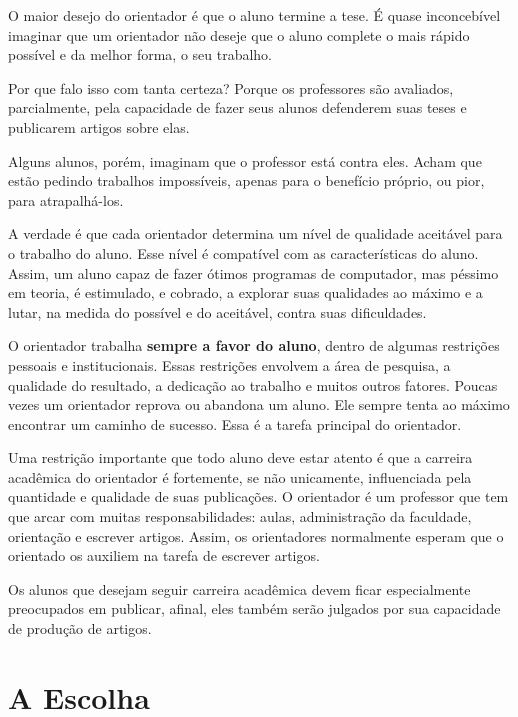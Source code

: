 O maior desejo do orientador é que o aluno termine a tese. É quase inconcebível imaginar que um orientador não deseje que o aluno complete o mais rápido possível e da melhor forma, o seu trabalho. 

Por que falo isso com tanta certeza? Porque os professores são avaliados, parcialmente, pela capacidade de fazer seus alunos defenderem suas teses e publicarem artigos sobre elas.

Alguns alunos, porém, imaginam que o professor está contra eles. Acham que estão pedindo trabalhos impossíveis, apenas para o benefício próprio, ou pior, para atrapalhá-los.

A verdade é que cada orientador determina um nível de qualidade aceitável para o trabalho do aluno. Esse nível é compatível com as características do aluno. 
Assim, um aluno capaz de fazer ótimos programas de computador, mas péssimo em teoria, é estimulado, e cobrado, a explorar suas qualidades ao máximo e a lutar, na medida do possível e do aceitável, contra suas dificuldades.

O orientador trabalha \textbf{sempre a favor do aluno}, dentro de algumas restrições pessoais e institucionais. 
Essas restrições envolvem a área de pesquisa, a qualidade do resultado, a dedicação ao trabalho e muitos outros fatores. 
Poucas vezes um orientador reprova ou abandona um aluno.
 Ele sempre tenta ao máximo encontrar um caminho de sucesso. 
 Essa é a tarefa principal do orientador.

Uma restrição importante que todo aluno deve estar atento é que a carreira acadêmica do orientador é fortemente, se não unicamente, influenciada pela quantidade e qualidade de suas publicações. 
O orientador é um professor que tem que arcar com muitas responsabilidades: aulas, administração da faculdade, orientação e escrever artigos. 
Assim, os orientadores normalmente esperam que o orientado os auxiliem na tarefa de escrever artigos. 

Os alunos que desejam seguir carreira acadêmica devem ficar especialmente preocupados em publicar, afinal, eles também serão julgados por sua capacidade de produção de artigos.



\section{A Escolha}


